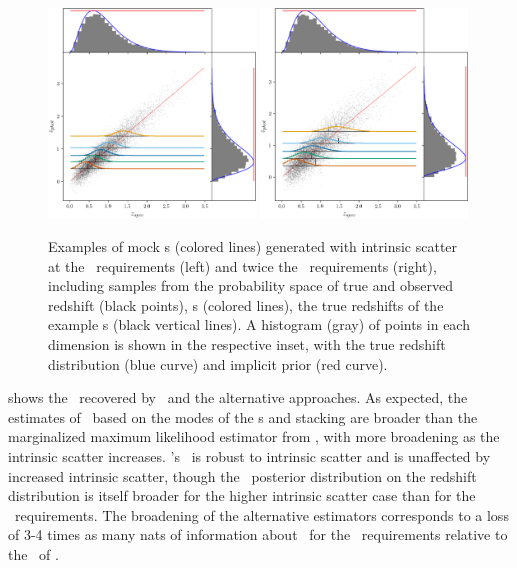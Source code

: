 \begin{figure}
	\includegraphics[width=0.49\textwidth]{figures/chippr/samplepzs_scatter1.png}
	\includegraphics[width=0.49\textwidth]{figures/chippr/samplepzs_scatter2.png}
	\caption{
		Examples of mock \pzpdf s (colored lines) generated with intrinsic scatter at the \lsst\ requirements (left) and twice the \lsst\ requirements (right), including samples from the probability space of true and observed redshift (black points), \pzpdf s (colored lines), the true redshifts of the example \pzpdf s (black vertical lines).
		A histogram (gray) of points in each dimension is shown in the respective inset, with the true redshift distribution (blue curve) and implicit prior (red curve).
	}
\end{figure}

 shows the \nz\ recovered by \Chippr\ and the alternative approaches.
As expected, the estimates of \nz\ based on the modes of the \pzpdf s and stacking are broader than the marginalized maximum likelihood estimator from \chippr, with more broadening as the intrinsic scatter increases.
\Chippr's \mmle\ is robust to intrinsic scatter and is unaffected by increased intrinsic scatter, though the \Chippr\ posterior distribution on the redshift distribution is itself broader for the higher intrinsic scatter case than for the \lsst\ requirements.
The broadening of the alternative estimators corresponds to a loss of 3-4 times as many nats of information about \nz\ for the \lsst\ requirements relative to the \mmle\ of \Chippr.

